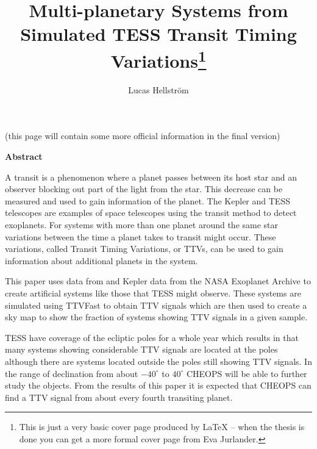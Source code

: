 \documentclass[12pt]{report}
\begin{document}
\title{\huge \bf Multi-planetary Systems from Simulated TESS Transit Timing Variations\footnote{This is just a very basic cover page produced by LaTeX -- when
the thesis is done you can get a more formal cover page from Eva Jurlander.}}
\author{Lucas Hellström}

\thispagestyle{empty} %

\maketitle

\newpage

\thispagestyle{empty}

\begin{center}
  (this page will contain some more official information in the final version)
\end{center}

\newpage

\thispagestyle{empty}

\begin{center}
  {\bf Abstract}
\end{center}
	A transit is a phenomenon where a planet passes between its host star and an observer blocking out part of the light from the star. This decrease can be measured and used to gain information of the planet. The Kepler and TESS telescopes are examples of space telescopes using the transit method to detect exoplanets. For systems with more than one planet around the same star variations between the time a planet takes to transit might occur. These variations, called Transit Timing Variations, or TTVs, can be used to gain information about additional planets in the system.
	
	This paper uses data from \cite{2015ApJ...809...77S} and Kepler data from the NASA Exoplanet Archive to create artificial systems like those that TESS might observe. These systems are simulated using TTVFast \citep{2014ApJ...787..132D} to obtain TTV signals which are then used to create a sky map to show the fraction of systems showing TTV signals in a given sample.
	
	TESS have coverage of the ecliptic poles for a whole year which results in that many systems showing considerable TTV signals are located at the poles although there are systems located outside the poles still showing TTV signals. In the range of declination from about $-40^{\circ}$ to $40^{\circ}$ CHEOPS will be able to further study the objects. From the results of this paper it is expected that CHEOPS can find a TTV signal from about every fourth transiting planet. 
	
\end{document}
